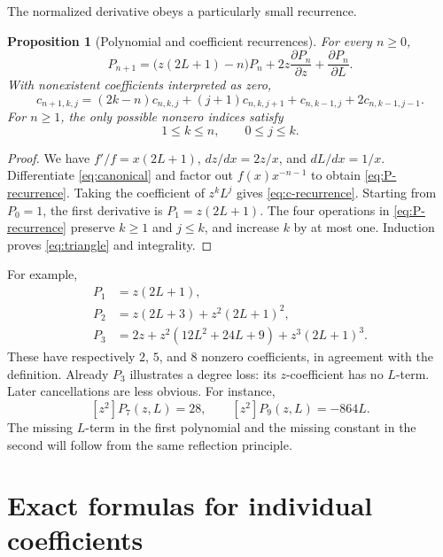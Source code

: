 \documentclass[11pt]{article}
\numberwithin{equation}{section}
\newtheorem{proposition}[theorem]{Proposition}
\theoremstyle{definition}
\theoremstyle{remark}
\begin{document}
The normalized derivative obeys a particularly small recurrence.
\begin{proposition}[Polynomial and coefficient recurrences]\label{prop:recurrence}
For every $n\ge0$,
\begin{equation}\label{eq:P-recurrence}
 P_{n+1}=\bigl(z(2L+1)-n\bigr)P_n
          +2z\frac{\partial P_n}{\partial z}
          +\frac{\partial P_n}{\partial L}.
\end{equation}
With nonexistent coefficients interpreted as zero,
\begin{equation}\label{eq:c-recurrence}
 \boxed{\;
 c_{n+1,k,j}=(2k-n)c_{n,k,j}+(j+1)c_{n,k,j+1}
             +c_{n,k-1,j}+2c_{n,k-1,j-1}.
 \;}
\end{equation}
For $n\ge1$, the only possible nonzero indices satisfy
\begin{equation}\label{eq:triangle}
 1\le k\le n,\qquad 0\le j\le k.
\end{equation}
\end{proposition}
\begin{proof}
We have $f'/f=x(2L+1)$, $dz/dx=2z/x$, and $dL/dx=1/x$.
Differentiate \eqref{eq:canonical} and factor out $f(x)x^{-n-1}$ to obtain
\eqref{eq:P-recurrence}. Taking the coefficient of $z^kL^j$ gives
\eqref{eq:c-recurrence}. Starting from $P_0=1$, the first derivative is
$P_1=z(2L+1)$. The four operations in \eqref{eq:P-recurrence} preserve
$k\ge1$ and $j\le k$, and increase $k$ by at most one. Induction proves
\eqref{eq:triangle} and integrality.
\end{proof}

For example,
\begin{align*}
 P_1&=z(2L+1),\\
 P_2&=z(2L+3)+z^2(2L+1)^2,\\
 P_3&=2z+z^2(12L^2+24L+9)+z^3(2L+1)^3.
\end{align*}
These have respectively $2$, $5$, and $8$ nonzero coefficients, in
agreement with the definition. Already $P_3$ illustrates a degree loss:
its $z$-coefficient has no $L$-term. Later cancellations are less obvious.
For instance,
\begin{equation}\label{eq:examples-cancel}
 [z^2]P_7(z,L)=28,\qquad [z^2]P_9(z,L)=-864L.
\end{equation}
The missing $L$-term in the first polynomial and the missing constant in
the second will follow from the same reflection principle.

\section{Exact formulas for individual coefficients}\label{sec:formulas}
\end{document}
